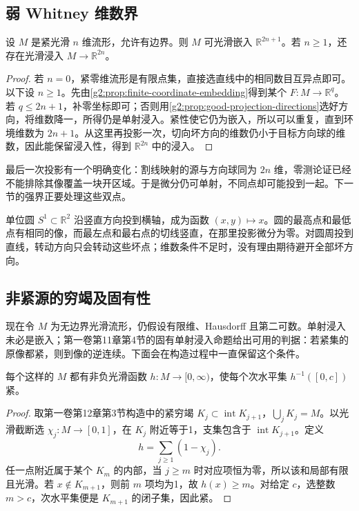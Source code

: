 \subsection{弱 Whitney 维数界}
\label{g2:subsec:1501:03}

\begin{theorem}\label{g2:thm:weak-whitney-compact}
	设 \(M\) 是紧光滑 \(n\) 维流形，允许有边界。则 \(M\) 可光滑嵌入 \(\mathbb R^{2n+1}\)。若 \(n\ge1\)，还存在光滑浸入 \(M\to\mathbb R^{2n}\)。
\end{theorem}
\begin{proof}
	若 \(n=0\)，紧零维流形是有限点集，直接选直线中的相同数目互异点即可。以下设 \(n\ge1\)。先由\cref{g2:prop:finite-coordinate-embedding}得到某个 \(F:M\to\mathbb R^q\)。若 \(q\le2n+1\)，补零坐标即可；否则用\cref{g2:prop:good-projection-directions}选好方向，将维数降一，所得仍是单射浸入。紧性使它仍为嵌入，所以可以重复，直到环境维数为 \(2n+1\)。从这里再投影一次，切向坏方向的维数仍小于目标方向球的维数，因此能保留浸入性，得到 \(\mathbb R^{2n}\) 中的浸入。
\end{proof}

最后一次投影有一个明确变化：割线映射的源与方向球同为 \(2n\) 维，零测论证已经不能排除其像覆盖一块开区域。于是微分仍可单射，不同点却可能投到一起。下一节的强界正要处理这些双点。

\begin{example}\label{g2:exm:circle-bad-projection}
	单位圆 \(S^1\subset\mathbb R^2\) 沿竖直方向投到横轴，成为函数 \((x,y)\mapsto x\)。圆的最高点和最低点有相同的像，而最左点和最右点的切线竖直，在那里投影微分为零。对圆周投到直线，转动方向只会转动这些坏点；维数条件不足时，没有理由期待避开全部坏方向。
\end{example}

\subsection{非紧源的穷竭及固有性}
\label{g2:subsec:1501:04}

现在令 \(M\) 为无边界光滑流形，仍假设有限维、Hausdorff 且第二可数。单射浸入未必是嵌入；第一卷第11章第4节的固有单射浸入命题给出可用的判据：若紧集的原像都紧，则到像的逆连续。下面会在构造过程中一直保留这个条件。

\begin{lemma}\label{g2:lem:smooth-proper-exhaustion}
	每个这样的 \(M\) 都有非负光滑函数 \(h:M\to[0,\infty)\)，使每个次水平集 \(h^{-1}([0,c])\) 紧。
\end{lemma}
\begin{proof}
	取第一卷第12章第3节构造中的紧穷竭 \(K_j\subset\operatorname{int}K_{j+1}\)，\(\bigcup_jK_j=M\)。以光滑截断选 \(\chi_j:M\to[0,1]\)，在 \(K_j\) 附近等于1，支集包含于 \(\operatorname{int}K_{j+1}\)。定义
	\[
		h=\sum_{j\ge1}(1-\chi_j).
	\]
	任一点附近属于某个 \(K_m\) 的内部，当 \(j\ge m\) 时对应项恒为零，所以该和局部有限且光滑。若 \(x\notin K_{m+1}\)，则前 \(m\) 项均为1，故 \(h(x)\ge m\)。对给定 \(c\)，选整数 \(m>c\)，次水平集便是 \(K_{m+1}\) 的闭子集，因此紧。
\end{proof}

